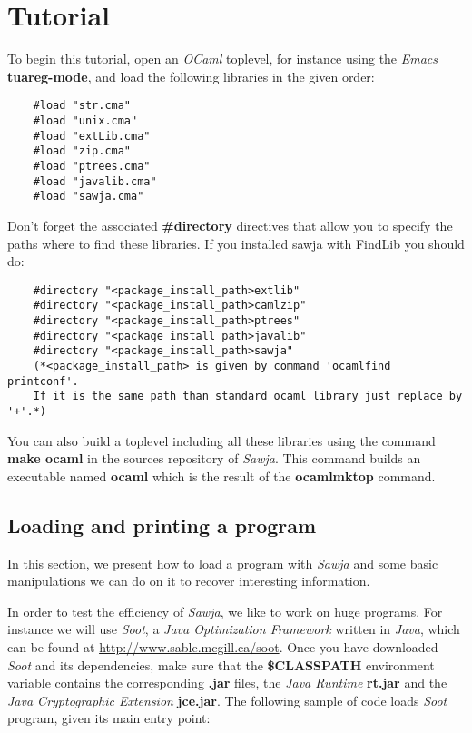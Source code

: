 \documentclass{article}
\begin{document}
\section{Tutorial}

To begin this tutorial, open an \emph{OCaml} toplevel, for instance
using the \emph{Emacs} \textbf{tuareg-mode}, and load the following
libraries in the given order:

\begin{verbatim}
    #load "str.cma"
    #load "unix.cma"
    #load "extLib.cma"
    #load "zip.cma"
    #load "ptrees.cma"
    #load "javalib.cma"
    #load "sawja.cma"
\end{verbatim}
Don't forget the associated \textbf{\#directory} directives that
allow you to specify the paths where to find these libraries. If
you installed sawja with FindLib you should do:

\begin{verbatim}
    #directory "<package_install_path>extlib"
    #directory "<package_install_path>camlzip"
    #directory "<package_install_path>ptrees"
    #directory "<package_install_path>javalib"
    #directory "<package_install_path>sawja"
    (*<package_install_path> is given by command 'ocamlfind printconf'. 
    If it is the same path than standard ocaml library just replace by '+'.*)
\end{verbatim}
You can also build a toplevel including all these libraries using
the command \textbf{make ocaml} in the sources repository of
\emph{Sawja}. This command builds an executable named
\textbf{ocaml} which is the result of the \textbf{ocamlmktop}
command.

\subsection{Loading and printing a program}

In this section, we present how to load a program with \emph{Sawja}
and some basic manipulations we can do on it to recover interesting
information.

In order to test the efficiency of \emph{Sawja}, we like to work on
huge programs. For instance we will use \emph{Soot}, a
\emph{Java Optimization Framework} written in \emph{Java}, which
can be found at
\href{http://www.sable.mcgill.ca/soot}{http://www.sable.mcgill.ca/soot}.
Once you have downloaded \emph{Soot} and its dependencies, make
sure that the \textbf{\$CLASSPATH} environment variable contains
the corresponding \textbf{.jar} files, the \emph{Java Runtime}
\textbf{rt.jar} and the \emph{Java Cryptographic Extension}
\textbf{jce.jar}. The following sample of code loads \emph{Soot}
program, given its main entry point:
\end{document}
